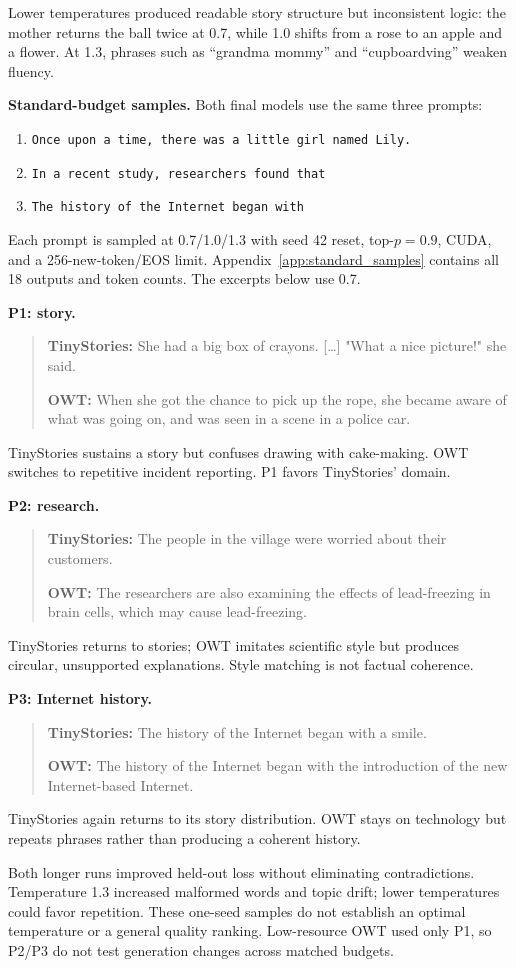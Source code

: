 Lower temperatures produced readable story structure but inconsistent
logic: the mother returns the ball twice at 0.7, while 1.0 shifts from a
rose to an apple and a flower. At 1.3, phrases such as ``grandma mommy''
and ``cupboardving'' weaken fluency.

\textbf{Standard-budget samples.}
Both final models use the same three prompts:
\begin{enumerate}[label=\textbf{P\arabic*:},leftmargin=*,nosep]
\item \texttt{Once upon a time, there was a little girl named Lily.}
\item \texttt{In a recent study, researchers found that}
\item \texttt{The history of the Internet began with}
\end{enumerate}
Each prompt is sampled at 0.7/1.0/1.3 with seed 42 reset, top-$p=0.9$,
CUDA, and a 256-new-token/EOS limit. Appendix~\ref{app:standard_samples}
contains all 18 outputs and token counts. The excerpts below use 0.7.

\textbf{P1: story.}
\begin{quote}\small
\textbf{TinyStories:} She had a big box of crayons. [\ldots]
"What a nice picture!" she said.

\textbf{OWT:} When she got the chance to pick up the rope, she became aware
of what was going on, and was seen in a scene in a police car.
\end{quote}
TinyStories sustains a story but confuses drawing with cake-making. OWT
switches to repetitive incident reporting. P1 favors TinyStories' domain.

\textbf{P2: research.}
\begin{quote}\small
\textbf{TinyStories:} The people in the village were worried about their customers.

\textbf{OWT:} The researchers are also examining the effects of lead-freezing
in brain cells, which may cause lead-freezing.
\end{quote}
TinyStories returns to stories; OWT imitates scientific style but produces
circular, unsupported explanations. Style matching is not factual coherence.

\textbf{P3: Internet history.}
\begin{quote}\small
\textbf{TinyStories:} The history of the Internet began with a smile.

\textbf{OWT:} The history of the Internet began with the introduction of the
new Internet-based Internet.
\end{quote}
TinyStories again returns to its story distribution. OWT stays on technology
but repeats phrases rather than producing a coherent history.

Both longer runs improved held-out loss without eliminating contradictions.
Temperature 1.3 increased malformed words and topic drift; lower temperatures
could favor repetition. These one-seed samples do not establish an optimal
temperature or a general quality ranking. Low-resource OWT used only P1,
so P2/P3 do not test generation changes across matched budgets.
